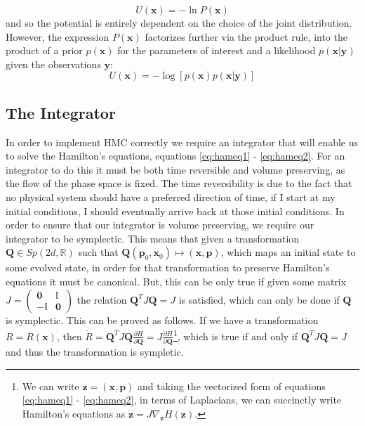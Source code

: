 \documentclass[twoside]{article}
\begin{document}
\begin{equation}
U(\textbf{x}) = -\ln P(\textbf{x})
\end{equation} and so the potential is entirely dependent on the choice of the joint distribution. However, the expression $P(\textbf{x})$ factorizes further via the product rule,
into the product of a prior $p(\textbf{x})$ for the parameters of interest and a likelihood $p(\textbf{x}|\textbf{y})$ given the observations $\textbf{y}$: \begin{equation}
U(\textbf{x}) = -\log[p(\textbf{x})p(\textbf{x}|\textbf{y})]
\end{equation}

\subsection{The Integrator}

In order to implement HMC correctly we require an integrator that will enable us to solve the Hamilton's equations, equations \ref{eq:hameq1} - \ref{eq:hameq2}. For an integrator to do this it must be both time reversible and volume preserving, as the flow of the phase space is fixed. The time reversibility is due to the fact that no physical system should have a preferred direction of time, if I start at my initial conditions, I should eventually arrive back at those initial conditions. In order to ensure that our integrator is volume preserving, we require our integrator to be symplectic. This means that given a transformation $\textbf{Q} \in Sp(2d, \mathbb{R})$ such that $\textbf{Q}(\textbf{p}_{0}, \textbf{x}_{0}) \mapsto (\textbf{x}, \textbf{p})$, which maps an initial state to some evolved state, in order for that transformation to preserve Hamilton's equations it must be canonical. But, this can be only true if given some matrix $J = \left(\begin{array}{cc} \mathbf{0} & \mathbb{I} \\ -\mathbb{I} & \mathbf{0}\end{array}\right)$ the relation $\textbf{Q}^{T}J\textbf{Q} = J$ is satisfied, which can only be done if $\textbf{Q}$ is symplectic. This can be proved as follows. If we have a transformation $R = R(\textbf{x})$, then $\dot{R} = \textbf{Q}^{T}J\textbf{Q}\frac{\partial H}{\partial \textbf{Q}} = J\frac{\partial H}{\partial \textbf{Q}}$\footnote{We can write $\textbf{z} = (\textbf{x}, \textbf{p})$ and taking the vectorized form of equations \ref{eq:hameq1} - \ref{eq:hameq2}, in terms of Laplacians, we can succinctly write Hamilton's equations as $\dot{\textbf{z}} = J\nabla_{\textbf{z}}H(\textbf{z})$. }, which is true if and only if $\textbf{Q}^{T}J\textbf{Q} = J$ and thus the transformation is sympletic.
\end{document}
